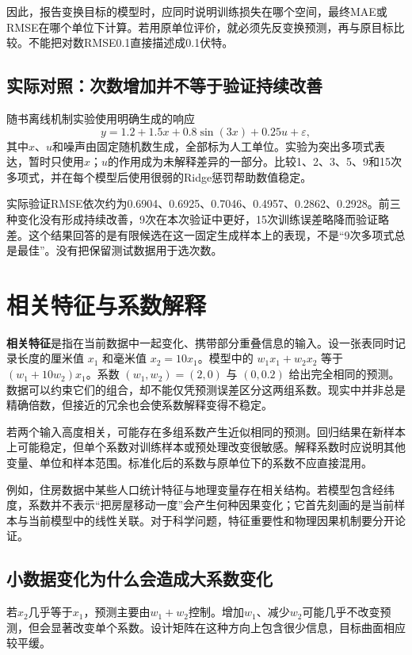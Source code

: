 因此，报告变换目标的模型时，应同时说明训练损失在哪个空间，最终MAE或RMSE在哪个单位下计算。若用原单位评价，就必须先反变换预测，再与原目标比较。不能把对数RMSE0.1直接描述成0.1伏特。

\subsection{实际对照：次数增加并不等于验证持续改善}
随书离线机制实验使用明确生成的响应
\[
y=1.2+1.5x+0.8\sin(3x)+0.25u+\varepsilon,
\]
其中$x$、$u$和噪声由固定随机数生成，全部标为人工单位。实验为突出多项式表达，暂时只使用$x$；$u$的作用成为未解释差异的一部分。比较1、2、3、5、9和15次多项式，并在每个模型后使用很弱的Ridge惩罚帮助数值稳定。

实际验证RMSE依次约为0.6904、0.6925、0.7046、0.4957、0.2862、0.2928。前三种变化没有形成持续改善，9次在本次验证中更好，15次训练误差略降而验证略差。这个结果回答的是有限候选在这一固定生成样本上的表现，不是“9次多项式总是最佳”。没有把保留测试数据用于选次数。


\section{相关特征与系数解释}

\textbf{相关特征}是指在当前数据中一起变化、携带部分重叠信息的输入。设一张表同时记录长度的厘米值 $x_1$ 和毫米值 $x_2=10x_1$。模型中的 $w_1x_1+w_2x_2$ 等于 $(w_1+10w_2)x_1$。系数 $(w_1,w_2)=(2,0)$ 与 $(0,0.2)$ 给出完全相同的预测。数据可以约束它们的组合，却不能仅凭预测误差区分这两组系数。现实中并非总是精确倍数，但接近的冗余也会使系数解释变得不稳定。

若两个输入高度相关，可能存在多组系数产生近似相同的预测。回归结果在新样本上可能稳定，但单个系数对训练样本或预处理改变很敏感。解释系数时应说明其他变量、单位和样本范围。标准化后的系数与原单位下的系数不应直接混用。

例如，住房数据中某些人口统计特征与地理变量存在相关结构。若模型包含经纬度，系数并不表示“把房屋移动一度”会产生何种因果变化；它首先刻画的是当前样本与当前模型中的线性关联。对于科学问题，特征重要性和物理因果机制要分开论证。

\subsection{小数据变化为什么会造成大系数变化}
若$x_2$几乎等于$x_1$，预测主要由$w_1+w_2$控制。增加$w_1$、减少$w_2$可能几乎不改变预测，但会显著改变单个系数。设计矩阵在这种方向上包含很少信息，目标曲面相应较平缓。

